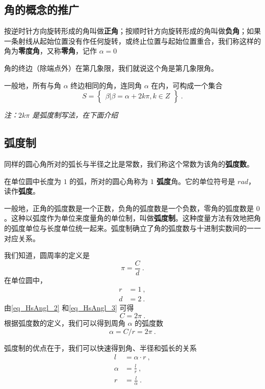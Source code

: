 
\begin{issues}
\issueNeedCite
\end{issues}


\subsection{角的概念的推广}
按逆时针方向旋转形成的角叫做\textbf{正角}；按顺时针方向旋转形成的角叫做\textbf{负角}；如果一条射线从起始位置没有作任何旋转，或终止位置与起始位置重合，我们称这样的角为\textbf{零度角}，又称\textbf{零角}，记作 $\alpha = 0$

角的终边（除端点外）在第几象限，我们就说这个角是第几象限角。

一般地，所有与角 $\alpha$ 终边相同的角，连同角 $\alpha$ 在内，可构成一个集合
\begin{equation}
S = \begin{Bmatrix} \beta|\beta=\alpha+2k\pi,k \in Z \end{Bmatrix}~.
\end{equation}

\textsl{注：$2k\pi$ 是弧度制写法，在下面介绍}

\subsection{弧度制}
同样的圆心角所对的弧长与半径之比是常数，我们称这个常数为该角的\textbf{弧度数}。

在单位圆中长度为 $1$ 的弧，所对的圆心角称为 \textbf{$1$ 弧度}角。它的单位符号是 $rad$，读作\textbf{弧度}。

一般地，正角的弧度数是一个正数，负角的弧度数是一个负数，零角的弧度数是 $0$。这种以弧度作为单位来度量角的单位制，叫做\textbf{弧度制}。这种度量方法有效地把角的弧度单位与长度单位统一起来。弧度制确立了角的弧度数与十进制实数间的一一对应关系。

我们知道，圆周率的定义是
\begin{equation}\label{eq_HsAngl_2}
\pi = \frac{C}{d}~.
\end{equation}
在单位圆中，
\begin{equation}\label{eq_HsAngl_3}
\begin{aligned}
r &= 1~,\\
d &= 2~.
\end{aligned}
\end{equation}
由\autoref{eq_HsAngl_2} 和\autoref{eq_HsAngl_3} 可得
\begin{equation}
C = 2\pi~.
\end{equation}
根据弧度数的定义，我们可以得到周角 $\alpha$ 的弧度数
\begin{equation}
\alpha = C / r = 2\pi~.
\end{equation}

弧度制的优点在于，我们可以快速得到角、半径和弧长的关系
\begin{equation}
\begin{aligned}
l &= \alpha \cdot r~, \\
\alpha &= \frac{l}{r}~, \\
r &= \frac{l}{\alpha}~.
\end{aligned}
\end{equation}
